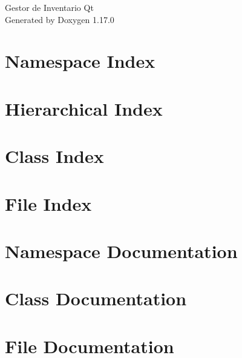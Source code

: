 \documentclass[twoside]{book}
\newcommand{\+}{\discretionary{\mbox{\scriptsize$\hookleftarrow$}}{}{}}
\newcommand{\clearemptydoublepage}{%
    \newpage{\pagestyle{empty}\cleardoublepage}%
  }
\begin{document}
  \raggedbottom
    \hypersetup{pageanchor=false,
                bookmarksnumbered=true,
                pdfencoding=unicode
               }
  \begin{titlepage}
  \vspace*{7cm}
  \begin{center}%
  {\Large Gestor de Inventario Qt}\\
  \vspace*{1cm}
  {\large Generated by Doxygen 1.17.0}\\
  \end{center}
  \end{titlepage}
  \clearemptydoublepage
  \tableofcontents
  \clearemptydoublepage
  \hypersetup{pageanchor=true}

\chapter{Namespace Index}

\chapter{Hierarchical Index}

\chapter{Class Index}

\chapter{File Index}

\chapter{Namespace Documentation}

\chapter{Class Documentation}

\chapter{File Documentation}





  \backmatter
  \newpage
  \clearemptydoublepage
  \printindex
\end{document}
